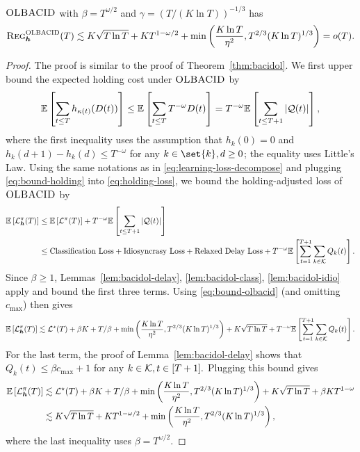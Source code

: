 \begin{proposition} $\textsc{OLBACID}$ with $\beta = T^{\omega/2}$ and $\gamma = (T/(K\ln T))^{-1/3}$ has 
\[\textsc{Reg}_{\boldsymbol{h}}^{\textsc{OLBACID}}(T) \lesssim K\sqrt{T\ln T} + KT^{1-\omega/2} + \min\left(\frac{K\ln T}{\eta^2}, T^{2/3}(K\ln T)^{1/3}\right) = o(T).\]
\end{proposition}
\begin{proof}
The proof is similar to the proof of Theorem~\ref{thm:bacidol}. We first upper bound the expected holding cost under $\textsc{OLBACID}$ by
\begin{equation}\label{eq:bound-holding}
\mathbb E\left[\sum_{t \leq T} h_{\kappa(t)}(D(t))\right] \leq \mathbb E\left[\sum_{t \leq T} T^{-\omega} D(t)\right] = T^{-\omega}\mathbb E\left[\sum_{t \leq T + 1} |\mathcal{Q}(t)|\right],
\end{equation}
where the first inequality uses the assumption that $h_k(0) = 0$ and $h_k(d+1)-h_k(d) \leq T^{-\omega}$ for any $k \in \set{k}, d \geq 0$; the equality uses Little's Law.
Using the same notations as in \eqref{eq:learning-loss-decompose} and plugging \eqref{eq:bound-holding} into \eqref{eq:holding-loss}, we bound the holding-adjusted loss of $\textsc{OLBACID}$ by
\begin{align*}
\mathbb E\left[\mathcal{L}^{\pi}_{\boldsymbol{h}}(T)\right] &\leq \mathbb E\left[\mathcal{L}^{\pi}(T)\right] + T^{-\omega}\mathbb E\left[\sum_{t\leq T+1} |\mathcal{Q}(t)|\right] \\
&\leq \text{Classification Loss} + \text{Idiosyncrasy Loss} + \text{Relaxed Delay Loss} + T^{-\omega}\mathbb E\left[\sum_{t =1}^{T+1} \sum_{k \in \mathcal{K}} Q_k(t)\right].
\end{align*}
Since $\beta \geq 1$, Lemmas~\ref{lem:bacidol-delay}, \ref{lem:bacidol-class}, \ref{lem:bacidol-idio} apply and bound the first three terms. Using \eqref{eq:bound-olbacid} (and omitting $c_{\max}$) then gives 
\[
\mathbb E\left[\mathcal{L}^{\pi}_{\boldsymbol{h}}(T)\right] \lesssim \mathcal{L}^\star(T) + \beta K + T / \beta + \min\left(\frac{K\ln T}{\eta^2}, T^{2/3}(K\ln T)^{1/3}\right) + K\sqrt{T\ln T} + T^{-\omega}\mathbb E\left[\sum_{t =1}^{T+1} \sum_{k \in \mathcal{K}} Q_k(t)\right].
\]
For the last term, the proof of Lemma~\ref{lem:bacidol-delay} shows that $Q_k(t) \leq \beta c_{\max}+1$ for any $k \in \mathcal{K}, t \in [T+1].$ Plugging this bound gives 
\begin{align*}
\mathbb E\left[\mathcal{L}^{\pi}_{\boldsymbol{h}}(T)\right] &\lesssim \mathcal{L}^\star(T) + \beta K + T / \beta + \min\left(\frac{K\ln T}{\eta^2}, T^{2/3}(K\ln T)^{1/3}\right) + K\sqrt{T\ln T} + \beta K T^{1-\omega} \\
&\lesssim K\sqrt{T\ln T} + KT^{1-\omega/2} + \min\left(\frac{K\ln T}{\eta^2}, T^{2/3}(K\ln T)^{1/3}\right),
\end{align*}
where the last inequality uses $\beta = T^{\omega / 2}.$
\end{proof}

